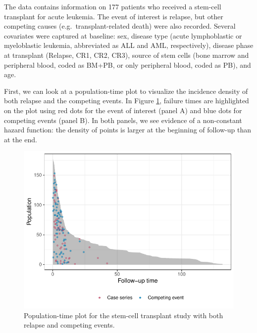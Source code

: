 \documentclass[
]{jss}
\begin{document}
The data contains information on 177 patients who received a stem-cell
transplant for acute leukemia. The event of interest is relapse, but
other competing causes (e.g.~transplant-related death) were also
recorded. Several covariates were captured at baseline: sex, disease
type (acute lymphoblastic or myeloblastic leukemia, abbreviated as ALL
and AML, respectively), disease phase at transplant (Relapse, CR1, CR2,
CR3), source of stem cells (bone marrow and peripheral blood, coded as
BM+PB, or only peripheral blood, coded as PB), and age.

First, we can look at a population-time plot to visualize the incidence
density of both relapse and the competing events. In Figure
\ref{fig:compPop}, failure times are highlighted on the plot using red
dots for the event of interest (panel A) and blue dots for competing
events (panel B). In both panels, we see evidence of a non-constant
hazard function: the density of points is larger at the beginning of
follow-up than at the end.

\begin{CodeChunk}
\begin{figure}

{\centering \includegraphics[width=\textwidth,keepaspectratio=true]{../figures/compPop-1} 

}

\caption[Population-time plot for the stem-cell transplant study with both relapse and competing events]{Population-time plot for the stem-cell transplant study with both relapse and competing events.}\label{fig:compPop}
\end{figure}
\end{CodeChunk}
\end{document}
